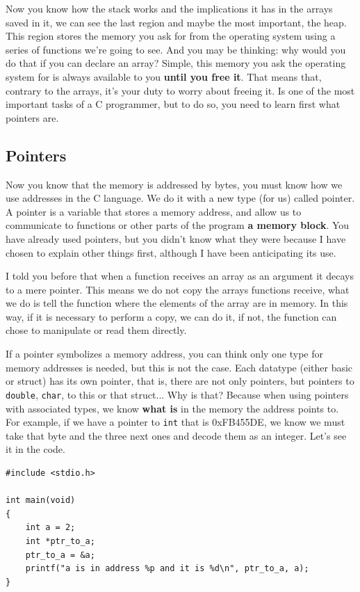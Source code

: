 \documentclass[a4paper]{article}
\begin{document}
Now you know how the stack works and the implications it has in the arrays
saved in it, we can see the last region and maybe the most important, the heap.
This region stores the memory you ask for from the operating system using a series of
functions we're going to see. And you may be thinking: why would you do that if
you can declare an array? Simple, this memory you ask the operating system for
is always available to you \textbf{until you free it}. That means that,
contrary to the arrays, it's your duty to worry about freeing it. Is one of the
most important tasks of a C programmer, but to do so, you need to learn first
what pointers are.

\subsection{Pointers}
Now you know that the memory is addressed by bytes, you must know how we use
addresses in the C language. We do it with a new type (for us) called pointer.
A pointer is a variable that stores a memory address, and allow us to
communicate to functions or other parts of the program \textbf{a memory block}.
You have already used pointers, but you didn't know what they were because I
have chosen to explain other things first, although I have been anticipating
its use.

I told you before that when a function receives an array as an argument it
decays to a mere pointer. This means we do not copy the arrays functions
receive, what we do is tell the function where the elements of the array are in
memory. In this way, if it is necessary to perform a copy, we can do it, if
not, the function can chose to manipulate or read them directly.

If a pointer symbolizes a memory address, you can think only one type for memory
addresses is needed, but this is not the case. Each datatype (either basic or
struct) has its own pointer, that is, there are not only pointers, but pointers
to \texttt{double}, \verb!char!, to this or that struct... Why is that? Because
when using pointers with associated types, we know \textbf{what is} in the
memory the address points to. For example, if we have a pointer to \verb!int!
that is 0xFB455DE, we know we must take that byte and the three next ones and
decode them as an integer. Let's see it in the code.

\noindent
\begin{minipage}[H]{\linewidth}
\mbox{}
\begin{lstlisting}[style=C, label={lst:pointers1},
caption={Pointer declaration}]
#include <stdio.h>

int main(void)
{
    int a = 2;
    int *ptr_to_a;
    ptr_to_a = &a;
    printf("a is in address %p and it is %d\n", ptr_to_a, a);
}
\end{lstlisting}
\end{minipage}
\end{document}
